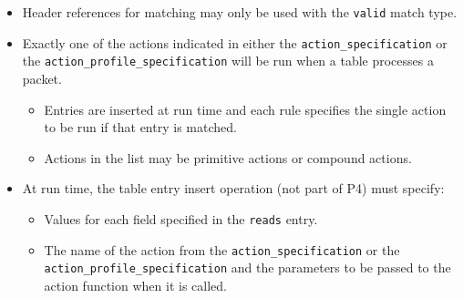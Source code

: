 \documentclass[12pt]{article}
\begin{document}
\begin{itemize}
\item
Header references for matching may only be used with the \texttt{valid} match type.
\item
Exactly one of the actions indicated in either the
\texttt{action_specification} or the \texttt{action_profile_specification}
will be run when a table processes a packet.

\begin{itemize}
\item
Entries are inserted at run time and each rule specifies the single action
to be run if that entry is matched.
\item
Actions in the list may be primitive actions or compound actions.
\end{itemize}

\item
At run time, the table entry insert operation (not part of P4) must specify:

\begin{itemize}
\item
Values for each field specified in the \texttt{reads} entry.
\item
The name of the action from the \texttt{action_specification} or the
\texttt{action_profile_specification} and the parameters to be passed to the
action function when it is called.
\end{itemize}


\end{itemize}
\end{document}
